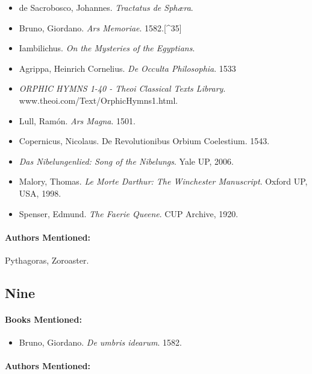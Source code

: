 \documentclass[12pt]{article}
\providecommand{\tightlist}{%
  \setlength{\itemsep}{0pt}\setlength{\parskip}{0pt}}
\begin{document}
\begin{itemize}
\tightlist
\item
  de Sacrobosco, Johannes. \emph{Tractatus de Sphæra}.
\item
  Bruno, Giordano. \emph{Ars Memoriae}. 1582.{[}\^{}35{]}
\item
  Iambilichus. \emph{On the Mysteries of the Egyptians}.
\item
  Agrippa, Heinrich Cornelius. \emph{De Occulta Philosophia}. 1533
\item
  \emph{ORPHIC HYMNS 1-40 - Theoi Classical Texts Library}. www.theoi.com/Text/OrphicHymns1.html.
\item
  Lull, Ramón. \emph{Ars Magna}. 1501.
\item
  Copernicus, Nicolaus. De Revolutionibus Orbium Coelestium. 1543.
\item
  \emph{Das Nibelungenlied: Song of the Nibelungs}. Yale UP, 2006.
\item
  Malory, Thomas. \emph{Le Morte Darthur: The Winchester Manuscript}. Oxford UP, USA, 1998.
\item
  Spenser, Edmund. \emph{The Faerie Queene}. CUP Archive, 1920.
\end{itemize}

\paragraph{Authors Mentioned:}\label{authors-mentioned-16}

Pythagoras, Zoroaster.

\subsection{Nine}\label{nine}

\paragraph{Books Mentioned:}\label{books-mentioned-23}

\begin{itemize}
\tightlist
\item
  Bruno, Giordano. \emph{De umbris idearum}. 1582.
\end{itemize}

\paragraph{Authors Mentioned:}\label{authors-mentioned-17}
\end{document}
